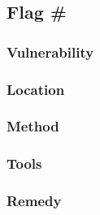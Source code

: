 \subsection{Flag \#}

\subsubsection{Vulnerability}

\subsubsection{Location}

\subsubsection{Method}

\subsubsection{Tools}

\subsubsection{Remedy}
